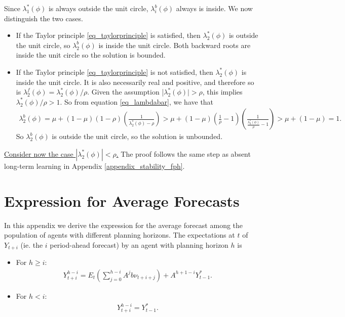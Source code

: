 Since $\lambda_1^*(\phi)$ is always outside the unit circle, $\lambda^b_i(\phi)$ always is inside. We now distinguish the two cases.

\begin{itemize}
\item If the Taylor principle \eqref{eq_taylorprinciple} is satisfied, then $\lambda_2^*(\phi)$ is outside the unit circle, so $\lambda^b_2(\phi)$ is inside the unit circle. Both backward roots are inside the unit circle so the solution is bounded.
\item If the Taylor principle \eqref{eq_taylorprinciple} is not satisfied, then $\lambda_2^*(\phi)$ is inside the unit circle. It is also necessarily real and positive, and therefore so is $\lambda_2^f(\phi)=\lambda_2^*(\phi)/\rho$. Given the assumption |$\lambda_2^*(\phi)|>\rho$, this implies $\lambda_2^*(\phi)/\rho>1$. So from equation \eqref{eq_lambdabar}, we have that
\begin{align}
\lambda_2^b(\phi) = \mu + (1-\mu)(1-\rho)\left(\frac{1}{\lambda_2^*(\phi)-\rho}\right) > \mu + (1-\mu)\left(\frac{1}{\rho}-1\right)\left(\frac{1}{\frac{\lambda_2^*(\phi)}{\rho}-1}\right) > \mu + (1-\mu)=1.
\end{align}
So $\lambda_2^b(\phi)$ is outside the unit circle, so the solution is unbounded.
\end{itemize}

\underline{Consider now the case $|\lambda_2^*(\phi)|<\rho$.} The proof follows the same step as absent long-term learning in Appendix \ref{appendix_stability_fph}.

\section{Expression for Average Forecasts}\label{appendix_forecasts}
In this appendix we derive the expression for the average forecast among the population of agents with different planning horizons. The expectations at $t$ of $Y_{t+i}$ (ie. the $i$ period-ahead forecast) by an agent with planning horizon $h$ is
\begin{itemize}
	\item For $h\geq i$:
	\begin{align}
	Y_{t+i}^{h-i} = E_t \left(\sum_{j=0}^{h-i} A^j b \nu_{t+i+j} \right) + A^{h+1-i} Y_{t-1}^*.
	\end{align}
	\item For $h< i$:
	\begin{align}
	Y_{t+i}^{h-i} = Y_{t-1}^*.
	\end{align} 
\end{itemize}

